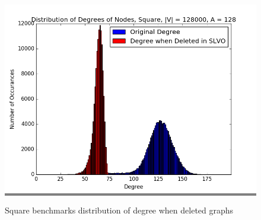 \documentclass{article}
\begin{document}
\begin{figure}
\begin{minipage}{0.3\textwidth}
    \colorbox{gray}{\includegraphics[width=\linewidth]{./graphs/hist_deg_del_square_6.png}}
    \end{minipage}
    \hspace{\fill}

    \caption{Square benchmarks distribution of degree when deleted graphs}
    \label{squaredegdelhists}
\end{figure}
\end{document}
